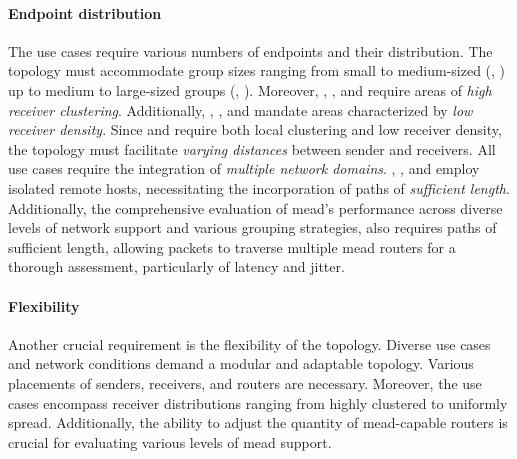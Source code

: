 \paragraph{Endpoint distribution} %
\label{par:Endpoint distribution}
The use cases require various numbers of endpoints and their distribution.
The topology must accommodate group sizes ranging from small to medium-sized
    (\uciii{}, \uciv{}) up to medium to large-sized groups (\uci{}, \ucii{}).
Moreover, \uci{}, \ucii{}, and \uciii{} require areas of \textit{high receiver clustering}.
Additionally, \uci{}, \uciii{}, and \uciv{} mandate areas characterized by \textit{low
    receiver density}.
Since \uci{} and \uciii{} require both local clustering and low receiver density, the
    topology must facilitate \textit{varying distances} between sender and
    receivers.
All use cases require the integration of \textit{multiple network domains}.
\uci{}, \uciii{}, and \uciv{} employ isolated remote hosts, necessitating the incorporation
    of paths of \textit{sufficient length}.
Additionally, the comprehensive evaluation of \gls{mead}'s performance across
    diverse levels of network support and various grouping strategies, also
    requires paths of sufficient length, allowing packets to traverse multiple
    \gls{mead} routers for a thorough assessment, particularly of latency and
    jitter.

\paragraph{Flexibility} %
\label{par:Flexibility2}
Another crucial requirement is the flexibility of the topology.
Diverse use cases and network conditions demand a modular and adaptable
    topology.
Various placements of senders, receivers, and routers are necessary.
Moreover, the use cases encompass receiver distributions ranging from highly
    clustered to uniformly spread.
Additionally, the ability to adjust the quantity of \gls{mead}-capable routers
    is crucial for evaluating various levels of \gls{mead} support.

